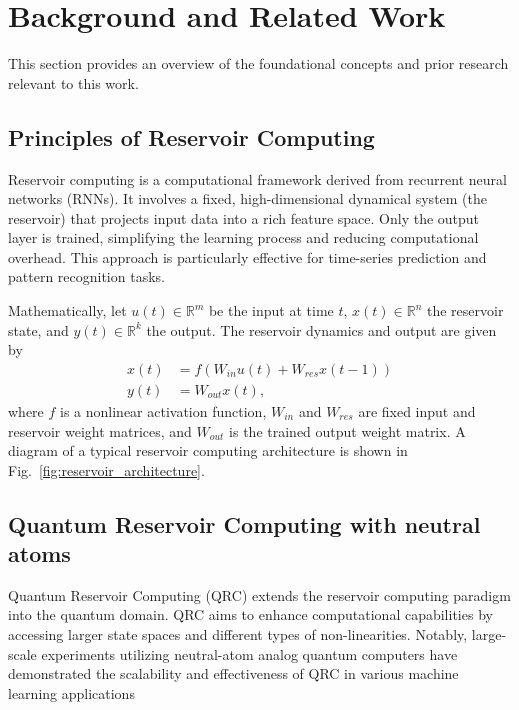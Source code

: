 \documentclass[conference]{IEEEtran}
\begin{document}
\section{Background and Related Work}
This section provides an overview of the foundational concepts and prior research relevant to this work.
\subsection{Principles of Reservoir Computing}
Reservoir computing is a computational framework derived from recurrent neural networks (RNNs). It involves a fixed, high-dimensional dynamical system (the 
reservoir) that projects input data into a rich feature space. Only the output layer is trained, simplifying the learning process and reducing computational overhead. This approach is particularly effective for time-series prediction and pattern recognition tasks.

Mathematically, let \( u(t) \in \mathbb{R}^m \) be the input at time \( t \),
\( x(t) \in \mathbb{R}^n \) the reservoir state, and
\( y(t) \in \mathbb{R}^k \) the output. The reservoir dynamics
and output are given by
\begin{align}
    x(t) &= f(W_{in} u(t) + W_{res} x(t-1)) \\
    y(t) &= W_{out} x(t),
\end{align}
%
%
where \( f \) is a nonlinear activation function,
\( W_{in} \) and \( W_{res} \) are fixed input and reservoir weight matrices, 
and \( W_{out} \) is the trained output weight matrix.
A diagram of a typical reservoir computing architecture is shown in Fig.~\ref{fig:reservoir_architecture}.




\subsection{Quantum Reservoir Computing with neutral atoms}

Quantum Reservoir Computing (QRC) extends the reservoir 
computing paradigm into the quantum domain. 
QRC aims to enhance computational capabilities by accessing larger state spaces and different types of non-linearities. 
Notably, large-scale experiments utilizing neutral-atom analog quantum computers have demonstrated the scalability and effectiveness of QRC in various machine learning applications~\cite{kornjavcaLargescaleQuantumReservoir2024}
\end{document}
